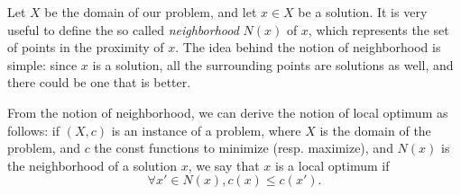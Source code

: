 \documentclass{subfiles}
\begin{document}
    Let $X$ be the domain of our problem, and let $x \in X$ be a solution.
        It is very useful to define the so called \emph{neighborhood} $N(x)$ of $x$,
        which represents the set of points in the proximity of $x$.
        The idea behind the notion of neighborhood is simple:
        since $x$ is a solution, all the surrounding points are solutions as well,
        and there could be one that is better.

    From the notion of neighborhood, we can derive the notion of local optimum as follows:
        if $(X, c)$ is an instance of a problem, where $X$ is the domain of the problem,
        and $c$ the const functions to minimize (resp. maximize), 
        and $N(x)$ is the neighborhood of a solution $x$,
        we say that $x$ is a local optimum if
        $$
            \forall x' \in N(x), c(x) \le c(x').
        $$
\end{document}
